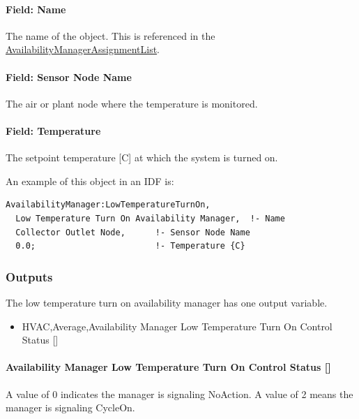 \paragraph{Field: Name}\label{field-name-7-021}

The name of the object. This is referenced in the \hyperref[availabilitymanagerassignmentlist]{AvailabilityManagerAssignmentList}.

\paragraph{Field: Sensor Node Name}\label{field-sensor-node-name-3}

The air or plant node where the temperature is monitored.

\paragraph{Field: Temperature}\label{field-temperature-3}

The setpoint temperature {[}C{]} at which the system is turned on.

An example of this object in an IDF is:

\begin{lstlisting}
AvailabilityManager:LowTemperatureTurnOn,
  Low Temperature Turn On Availability Manager,  !- Name
  Collector Outlet Node,      !- Sensor Node Name
  0.0;                        !- Temperature {C}
\end{lstlisting}

\subsubsection{Outputs}\label{outputs-7-010}

The low temperature turn on availability manager has one output variable.

\begin{itemize}
\tightlist
\item
  HVAC,Average,Availability Manager Low Temperature Turn On Control Status {[]}
\end{itemize}

\paragraph{Availability Manager Low Temperature Turn On Control Status {[]}}\label{availability-manager-low-temperature-turn-on-control-status}

A value of 0 indicates the manager is signaling NoAction. A value of 2 means the manager is signaling CycleOn.

